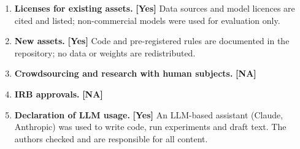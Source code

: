 \documentclass{article}
\begin{document}
\begin{enumerate}[leftmargin=1.5em]
\item \textbf{Licenses for existing assets.} \textbf{[Yes]} Data sources and model licences are cited and listed; non-commercial models were used for evaluation only.
\item \textbf{New assets.} \textbf{[Yes]} Code and pre-registered rules are documented in the repository; no data or weights are redistributed.
\item \textbf{Crowdsourcing and research with human subjects.} \textbf{[NA]}
\item \textbf{IRB approvals.} \textbf{[NA]}
\item \textbf{Declaration of LLM usage.} \textbf{[Yes]} An LLM-based assistant (Claude, Anthropic) was used to write code, run experiments and draft text. The authors checked and are responsible for all content.
\end{enumerate}
\end{document}
